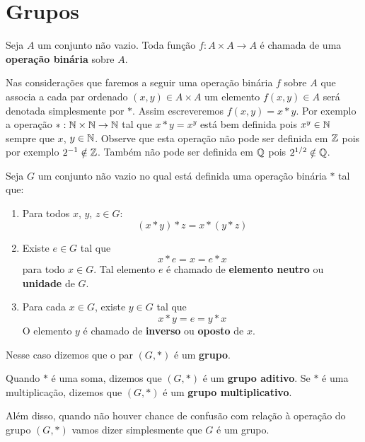 \chapter{Grupos}

\begin{definicao}
   Seja $A$ um conjunto n\~ao vazio. Toda fun\c{c}\~ao $f : A \times A \to A$ \'e chamada de uma \textbf{opera\c{c}\~ao bin\'aria} sobre $A$.
\end{definicao}

Nas considera\c{c}\~oes que faremos a seguir uma opera\c{c}\~ao bin\'aria $f$ sobre $A$ que associa a cada par ordenado $(x, y) \in A \times A$ um elemento $f(x, y) \in A$ ser\'a denotada simplesmente por $*$. Assim escreveremos $f(x, y) = x*y$. Por exemplo a opera\c{c}\~ao $* : \mathbb{N} \times \mathbb{N} \to \mathbb{N}$ tal que $x*y = x^y$ est\'a bem definida pois $x^y \in \mathbb{N}$ sempre que $x$, $y \in \mathbb{N}$. Observe que esta opera\c{c}\~ao n\~ao pode ser definida em $\mathbb{Z}$ pois por exemplo $2^{-1} \notin \mathbb{Z}$. Tamb\'em n\~ao pode ser definida em $\mathbb{Q}$ pois $2^{1/2} \notin \mathbb{Q}$.

\begin{definicao}
	Seja $G$ um conjunto n{\~a}o vazio no qual est\'a definida uma opera{\c c}{\~a}o bin{\'a}ria $*$ tal que:
	\begin{enumerate}[label={\roman*})]
		\item Para todos $x$, $y$, $z\in G$:
		\[
			(x*y)*z=x*(y*z)
		\]
		
		\item Existe $e \in G$ tal que
		\[
			x*e = x = e*x
		\]
		para todo $x \in G$. Tal elemento $e$ {\'e} chamado de \textbf{elemento neutro} ou \textbf{unidade} de $G$.

		\item Para cada $x \in G$, existe $y \in G$ tal que
		\[
			x*y = e = y*x
		\]
		O elemento $y$ {\'e} chamado de \textbf{inverso} ou \textbf{oposto} de $x$.
	\end{enumerate}
	Nesse caso dizemos que o par $(G, *)$ \'e um \textbf{grupo}.
\end{definicao}

\begin{observacao}
	Quando $*$ {\'e} uma soma, dizemos que $(G,*)$ {\'e} um \textbf{grupo aditivo}. Se $*$ {\'e} uma multiplica{\c c}{\~a}o, dizemos que $(G,*)$ {\'e} um \textbf{grupo multiplicativo}.

	Al\'em disso, quando n\~ao houver chance de confus\~ao com rela\c{c}\~ao \`a opera\c{c}\~ao do grupo $(G, *)$ vamos dizer simplesmente que $G$ \'e um grupo.
\end{observacao}

